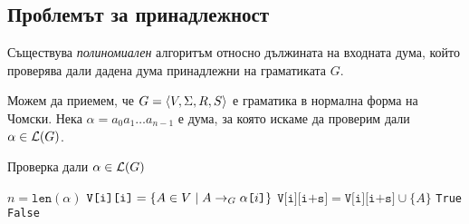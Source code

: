 \subsection{Проблемът за принадлежност}

\begin{theorem}
  Съществува {\em полиномиален} алгоритъм относно дължината на входната дума, който проверява дали дадена дума принадлежни на граматиката $G$.
\end{theorem}
Можем да приемем, че $G = \langle{V,\Sigma,R,S}\rangle$ е граматика в нормална форма на Чомски.
Нека $\alpha = a_0a_1\dots a_{n-1}$ е дума, за която искаме да проверим дали $\alpha \in \mathcal{L}(G)$.
\begin{algorithm}[H]
  \caption{Проверка дали $\alpha \in \mathcal{L}(G)$}
  \label{alg:belongs-to-grammar}
  \begin{algorithmic}[1]
    \State $n = \texttt{len}(\alpha)$ 
    \State $\texttt{V[i][i]} = \{A \in V \mid A\to_G \alpha\texttt{[}{i}\texttt{]}\}$ \label{alg:cyk:initial}
    \Else
    \EndIf
    \EndFor
    \EndFor
    \ForAll{$s \in [1, n)$}  \label{alg:cyk:first-loop}
    \ForAll{$k \in [i, i + s)$}
    \State $\texttt{V[i][i+s]} = \texttt{V[i][i+s]} \cup \{A\}$ \label{alg:cyk:add-variable}
    \EndIf
    \EndFor
    \EndFor
    \EndFor
    \State \Return \texttt{True}
    \Else
    \State \Return \texttt{False}
    \EndIf
  \end{algorithmic}
\end{algorithm}

